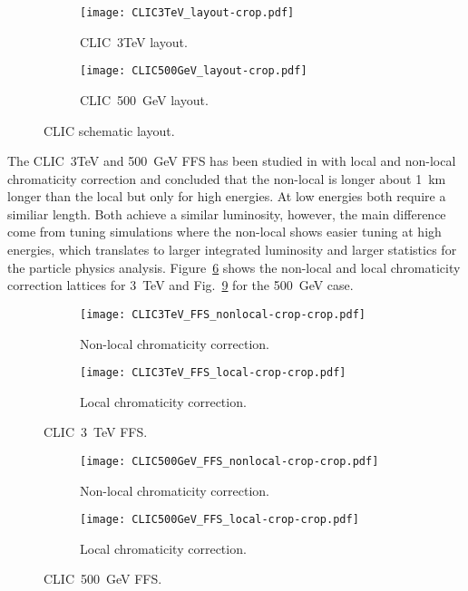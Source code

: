 \begin{figure}[h]
\centering
\begin{subfigure}{1.0\textwidth}
\texttt{[image: CLIC3TeV\_layout-crop.pdf]}\caption{CLIC~3TeV layout.}\label{f:CLIC3TeVlayout} 
\end{subfigure}\par
\begin{subfigure}{1.0\textwidth}
\texttt{[image: CLIC500GeV\_layout-crop.pdf]}\caption{CLIC~500~GeV layout.}\label{f:CLIC500GeVlayout} 
\end{subfigure}\caption{CLIC schematic layout.}\label{f:CLIClayout}
\end{figure}
The CLIC~3TeV and 500~GeV FFS has been studied in \cite{GarciaMorales:1982827} with local and non-local chromaticity correction and concluded that the non-local is longer about 1~km longer than the local but only for high energies. At low energies both require a similiar length. Both achieve a similar luminosity, however, the main difference come from tuning simulations where the non-local shows easier tuning at high energies, which translates to larger integrated luminosity and larger statistics for the particle physics analysis. Figure~\ref{f:CLIC3TeVFFS} shows the non-local and local chromaticity correction lattices for 3~TeV and Fig.~\ref{f:CLIC500GeVFFS} for the 500~GeV case.\par
\begin{figure}[h]
\centering
\begin{subfigure}{0.5\textwidth}
\texttt{[image: CLIC3TeV\_FFS\_nonlocal-crop-crop.pdf]}\caption{Non-local chromaticity correction.}\label{f:CLIC3TeVFFSnonlocal}
\end{subfigure}\hspace*{0.5cm}
\begin{subfigure}{0.5\textwidth}
\texttt{[image: CLIC3TeV\_FFS\_local-crop-crop.pdf]}\caption{Local chromaticity correction.}\label{f:CLIC3TeVFFSlocal} 
\end{subfigure}\caption{CLIC~3~TeV FFS.}\label{f:CLIC3TeVFFS}
\end{figure}
\begin{figure}[h]
\centering
\begin{subfigure}{0.5\textwidth}
\texttt{[image: CLIC500GeV\_FFS\_nonlocal-crop-crop.pdf]}\caption{Non-local chromaticity correction.}\label{f:CLIC500GeVFFSnonlocal} 
\end{subfigure}\hspace*{0.5cm}
\begin{subfigure}{0.5\textwidth}
\texttt{[image: CLIC500GeV\_FFS\_local-crop-crop.pdf]}\caption{Local chromaticity correction.}\label{f:CLIC500GeVFFSlocal} 
\end{subfigure}\caption{CLIC~500~GeV FFS.}\label{f:CLIC500GeVFFS}
\end{figure}

